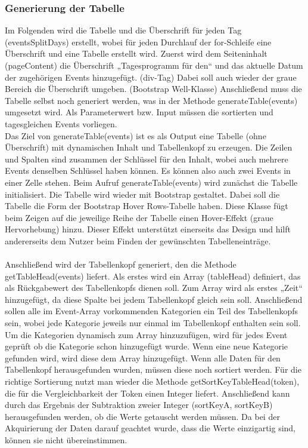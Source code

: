 {\subsubsection{Generierung der Tabelle}
Im Folgenden wird die Tabelle und die Überschrift für jeden Tag (eventsSplitDays) erstellt, wobei für jeden Durchlauf der for-Schleife eine Überschrift und eine Tabelle erstellt wird. Zuerst wird dem Seiteninhalt (pageContent) die Überschrift „Tagesprogramm für den“ und das aktuelle Datum der zugehörigen Events hinzugefügt. (div-Tag) Dabei soll auch wieder der graue Bereich die Überschrift umgeben. (Bootstrap Well-Klasse) 
Anschließend muss die Tabelle selbst noch generiert werden, was in der Methode generateTable(events) umgesetzt wird. Als Parameterwert bzw. Input müssen die sortierten und tagesgleichen Events vorliegen. \\
Das Ziel von generateTable(events) ist es als Output eine Tabelle (ohne Überschrift) mit dynamischen Inhalt und Tabellenkopf zu erzeugen. Die Zeilen und Spalten sind zusammen der Schlüssel für den Inhalt, wobei auch mehrere Events denselben Schlüssel haben können. Es können also auch zwei Events in einer Zelle stehen. 
Beim Aufruf generateTable(events) wird zunächst die Tabelle initialisiert. Die Tabelle wird wieder mit Bootstrap gestaltet. Dabei soll die Tabelle die Form der Bootstrap Hover Rows-Tabelle haben. Diese Klasse fügt beim Zeigen auf die jeweilige Reihe der Tabelle einen Hover-Effekt (graue Hervorhebung) hinzu.  Dieser Effekt unterstützt einerseits das Design und hilft andererseits dem Nutzer beim Finden der gewünschten Tabelleneinträge. \\
\\
Anschließend wird der Tabellenkopf generiert, den die Methode getTableHead(events) liefert. Als erstes wird ein Array (tableHead) definiert, das als Rückgabewert des Tabellenkopfs dienen soll. Zum Array wird als erstes „Zeit“ hinzugefügt, da diese Spalte bei jedem Tabellenkopf gleich sein soll. Anschließend sollen alle im Event-Array vorkommenden Kategorien ein Teil des Tabellenkopfs sein, wobei jede Kategorie jeweils nur einmal im Tabellenkopf enthalten sein soll. Um die Kategorien dynamisch zum Array hinzuzufügen, wird für jedes Event geprüft ob die Kategorie schon hinzugefügt wurde. Wenn eine neue Kategorie gefunden wird, wird diese dem Array hinzugefügt. Wenn alle Daten für den Tabellenkopf herausgefunden wurden, müssen diese noch sortiert werden. Für die richtige Sortierung nutzt man wieder die Methode getSortKeyTableHead(token), die für die Vergleichbarkeit der Token einen Integer liefert. Anschließend kann durch das Ergebnis der Subtraktion zweier Integer (sortKeyA, sortKeyB) herausgefunden werden, ob die Werte getauscht werden müssen. Da bei der Akquirierung der Daten darauf geachtet wurde, dass die Werte einzigartig sind, können sie nicht übereinstimmen.
}
